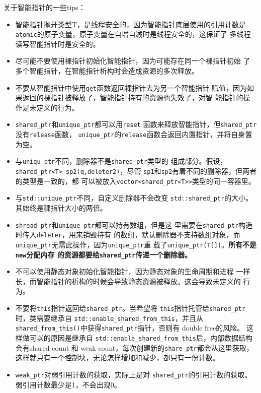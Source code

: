 关于智能指针的一些tips：
\begin{itemize}
\item 智能指针抛开类型T，是线程安全的，因为智能指针底层使用的引用计数是
\texttt{atomic}的原子变量，原子变量在自增自减时是线程安全的，这保证了
多线程读写智能指针时是安全的。
\item 尽可能不要使用裸指针初始化智能指针，因为可能存在同一个裸指针初始
  了多个智能指针，在智能指针析构时会造成资源的多次释放。
\item 不要从智能指针中使用\texttt{get}函数返回裸指针去为另一个智能指针
  赋值，因为如果返回的裸指针被释放了，智能指针持有的资源也失效了，对智
  能指针的操作是未定义的行为。
\item \texttt{shared\_ptr}和\texttt{unique\_ptr}都可以用\texttt{reset}
  函数来释放智能指针，但\texttt{shared\_ptr}没有\texttt{release}函数，
  \texttt{unique\_ptr}的\texttt{release}函数会返回内置指针，并将自身置
  为空。
\item 与\texttt{uniqu\_ptr}不同，删除器不是\texttt{shared\_ptr}类型的
  组成部分。假设，\texttt{shared\_ptr<T> sp2(q,deleter2)}，尽管
  \texttt{sp1}和\texttt{sp2}有着不同的删除器，但两者的类型是一致的，都
  可以被放入\texttt{vector<shared\_ptr<T>>}类型的同一容器里。
\item 与\texttt{std::unique\_ptr}不同，自定义删除器不会改变
  \texttt{std::shared\_ptr}的大小。其始终是祼指针大小的两倍。
\item \texttt{shread\_ptr}和\texttt{unique\_ptr}都可以持有数组，但是这
  里需要在\texttt{shared\_ptr}构造时传入\texttt{deleter}，用来销毁持有
  的数组，默认删除器不支持数组对象，而\texttt{unique\_ptr}无需此操作，因为\texttt{unique\_ptr}重
  载了\texttt{unique\_ptr(T[])}。\textbf{所有不是\texttt{new}分配内存
    的资源都要给\texttt{shared\_ptr}传递一个删除器。}
\item 不可以使用静态对象初始化智能指针，因为静态对象的生命周期和进程
  一样长，而智能指针的析构的时候会导致静态资源被释放。这会导致未定义的
  行为。
\item 不要将\texttt{this}指针返回给\texttt{shared\_ptr}。当希望将
  \texttt{this}指针托管给\texttt{shared\_ptr}时，类需要继承自
  \texttt{std::enable\_shared\_from\_this}，并且从
  \texttt{shared\_from\_this()}中获得\texttt{shared\_ptr}指针，否则有
  double free的风险。 这样做可以的原因是继承自
  \texttt{std::enable\_shared\_from\_this}后，内部数据结构会有shared
  count 和 weak count，每次创建新的\texttt{share\_ptr}都会从这里获取，
  这样就只有一个控制块，无论怎样增加和减少，都只有一份计数。
\item \texttt{weak\_ptr}对弱引用计数的获取，实际上是对
  \texttt{shared\_ptr}的引用计数的获取。弱引用计数最少是1，不会出现0。
\end{itemize}
